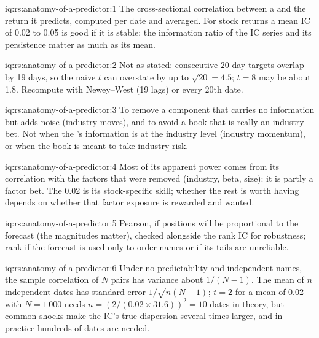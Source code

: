 \begin{solution}{iq:rs:anatomy-of-a-predictor:1}
The cross-sectional correlation between a  and the return it predicts, computed per date and averaged. For stock returns a
mean IC of 0.02 to 0.05 is good if it is stable; the information ratio of the IC series and its persistence matter as much as its
mean.
\end{solution}

\begin{solution}{iq:rs:anatomy-of-a-predictor:2}
Not as stated: consecutive 20-day targets overlap by 19 days, so the naive $t$ can overstate by up to $\sqrt{20} = 4.5$; $t = 8$ may be
about 1.8. Recompute with Newey--West (19 lags) or every 20th date.
\end{solution}

\begin{solution}{iq:rs:anatomy-of-a-predictor:3}
To remove a component that carries no information but adds noise (industry moves), and to avoid a book that is really an industry
bet. Not when the 's information is at the industry level (industry momentum), or when the book is meant to take industry
risk.
\end{solution}

\begin{solution}{iq:rs:anatomy-of-a-predictor:4}
Most of its apparent power comes from its correlation with the factors that were removed (industry, beta, size): it is partly a
factor bet. The 0.02 is its stock-specific skill; whether the rest is worth having depends on whether that factor exposure is
rewarded and wanted.
\end{solution}

\begin{solution}{iq:rs:anatomy-of-a-predictor:5}
Pearson, if positions will be proportional to the forecast (the magnitudes matter), checked alongside the rank IC for robustness; rank
if the forecast is used only to order names or if its tails are unreliable.
\end{solution}

\begin{solution}{iq:rs:anatomy-of-a-predictor:6}
Under no predictability and independent names, the sample correlation of $N$ pairs has variance about $1/(N - 1)$. The mean of $n$
independent dates has standard error $1/\sqrt{n(N - 1)}$; $t = 2$ for a mean of 0.02 with $N = 1\,000$ needs $n = (2/(0.02 \times
31.6))^2 = 10$ dates in theory, but common shocks make the IC's true dispersion several times larger, and in practice hundreds of
dates are needed.
\end{solution}
